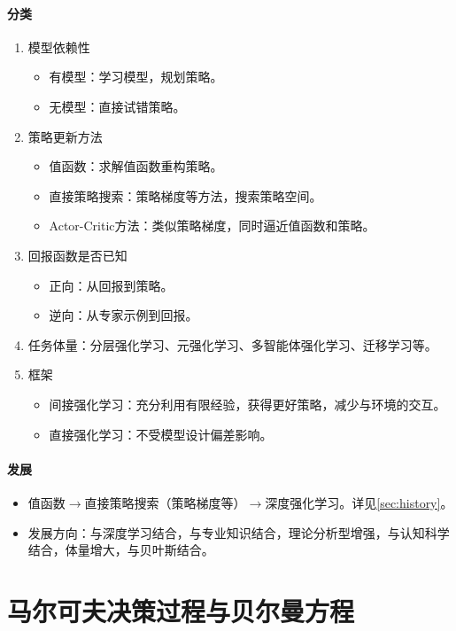 \documentclass[
12pt, %
a4paper, 
oneside, %
headinclude,footinclude, %
]{scrartcl}
\begin{document}
\paragraph{分类}
\begin{enumerate}
\item 模型依赖性
\begin{itemize}
\item 有模型：学习模型，规划策略。
\item 无模型：直接试错策略。
\end{itemize}
\item 策略更新方法
\begin{itemize}
\item 值函数：求解值函数重构策略。
\item 直接策略搜索：策略梯度等方法，搜索策略空间。
\item Actor-Critic方法：类似策略梯度，同时逼近值函数和策略。
\end{itemize}
\item 回报函数是否已知
\begin{itemize}
\item 正向：从回报到策略。
\item 逆向：从专家示例到回报。
\end{itemize}
\item 任务体量：分层强化学习、元强化学习、多智能体强化学习、迁移学习等。
\item 框架
\begin{itemize}
\item 间接强化学习：充分利用有限经验，获得更好策略，减少与环境的交互。
\item 直接强化学习：不受模型设计偏差影响。
\end{itemize}
\end{enumerate}
\paragraph{发展}\label{sec:history back}
\begin{itemize}
\item 值函数$ \rightarrow $直接策略搜索（策略梯度等）$ \rightarrow $深度强化学习。详见\ref{sec:history}。
\item 发展方向：与深度学习结合，与专业知识结合，理论分析型增强，与认知科学结合，体量增大，与贝叶斯结合。
\end{itemize}
\section{马尔可夫决策过程与贝尔曼方程}
\end{document}
